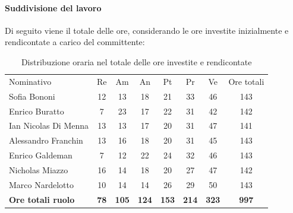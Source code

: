 \documentclass[../piano-di-progetto.tex]{subfiles}
\begin{document}
  \paragraph{Suddivisione del lavoro}
  Di seguito viene il totale delle ore, considerando le ore investite inizialmente e rendicontate a carico del committente:
  \begin{table}[H]
    \centering
    \begin{tabular}{lccccccc}
    Nominativo                & Re          & Am           & An           & Pt           & Pr           & Ve           & Ore totali   \\
    Sofia Bononi              & 12          & 13           & 18           & 21           & 33           & 46           & 143          \\
    Enrico Buratto            & 7           & 23           & 17           & 22           & 31           & 42           & 142          \\
    Ian Nicolas Di Menna      & 13          & 13           & 17           & 20           & 31           & 47           & 141          \\
    Alessandro Franchin       & 13          & 16           & 18           & 20           & 31           & 45           & 143          \\
    Enrico Galdeman           & 7           & 12           & 22           & 24           & 32           & 46           & 143          \\
    Nicholas Miazzo           & 16          & 14           & 18           & 20           & 27           & 47           & 142          \\
    Marco Nardelotto          & 10          & 14           & 14           & 26           & 29           & 50           & 143          \\
    \textbf{Ore totali ruolo} & \textbf{78} & \textbf{105} & \textbf{124} & \textbf{153} & \textbf{214} & \textbf{323} & \textbf{997}
    \end{tabular}
    \caption{Distribuzione oraria nel totale delle ore investite e rendicontate}
    \end{table}
\end{document}
